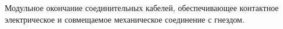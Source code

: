 Модульное окончание соединительных кабелей,
обеспечивающее контактное электрическое и совмещаемое
механическое соединение с гнездом.